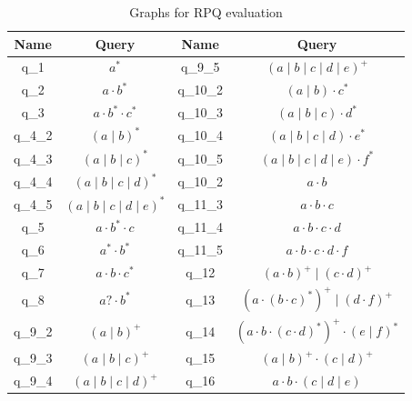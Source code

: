 \begin{table}
{\small
\begin{tabular}{|c|c||c|c|}
\hline

Name & Query & Name & Query \\
\hline
\hline 
q\_1    & $a^*$                               & q\_9\_5  & $(a \mid b \mid c \mid d \mid e)^+$                     \\
q\_2    & $a\cdot b^*$                        & q\_10\_2 & $(a \mid b) \cdot c^*$                                  \\
q\_3    & $a \cdot b^* \cdot c^*$             & q\_10\_3 & $(a \mid b \mid c)  \cdot d^*$                          \\
q\_4\_2 & $(a \mid b)^*$                      & q\_10\_4 & $(a \mid b \mid c \mid d)  \cdot e^*$                   \\
q\_4\_3 & $(a \mid b \mid c)^*$               & q\_10\_5 & $(a \mid b \mid c \mid d \mid e)  \cdot f^*$            \\
q\_4\_4 & $(a \mid b \mid c \mid d)^*$        & q\_10\_2 & $a \cdot b$                                             \\
q\_4\_5 & $(a \mid b \mid c \mid d \mid e)^*$ & q\_11\_3 & $a \cdot b \cdot c$                                     \\
q\_5    & $a \cdot b^* \cdot c$               & q\_11\_4 & $a \cdot b \cdot c \cdot d$                             \\
q\_6    & $a^* \cdot b^*$                     & q\_11\_5 & $a \cdot b \cdot c \cdot d \cdot f$                     \\
q\_7    & $a \cdot b \cdot c^*$               & q\_12    & $(a \cdot b)^+ \mid  (c \cdot d)^+$                     \\
q\_8    & $a? \cdot b^*$                      & q\_13    & $(a \cdot(b \cdot c)^*)^+ \mid  (d \cdot f)^+$          \\
q\_9\_2 & $(a \mid b)^+$                      & q\_14    & $(a \cdot b \cdot (c \cdot d)^*)^+  \cdot (e \mid f)^*$ \\
q\_9\_3 & $(a \mid b \mid c)^+$               & q\_15    & $(a \mid b)^+ \cdot (c \mid d)^+$                       \\
q\_9\_4 & $(a \mid b \mid c \mid d)^+$        & q\_16    & $a \cdot b \cdot (c \mid d \mid e)$                     \\
\hline
\end{tabular}
}
\caption{Graphs for RPQ evaluation}
\label{tbl:queries_templates}
\end{table}


